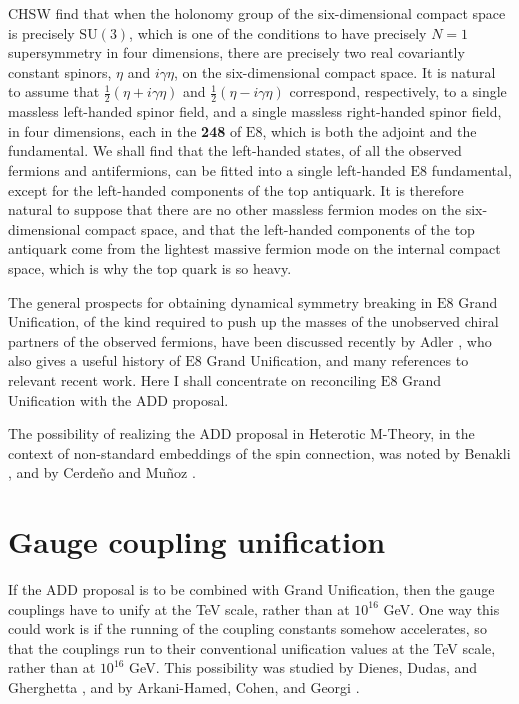 \documentclass[a4paper,12pt,oneside]{article}
\begin{document}
CHSW find that when the holonomy group of the six-dimensional 
compact space is precisely $\mathrm{SU}(3)$, which is one of the 
conditions to have precisely $N = 1$ supersymmetry in four 
dimensions, there are precisely two real covariantly constant 
spinors, $\eta$ and $i\gamma\eta$, on the six-dimensional compact 
space.  It is natural to assume that $\frac{1}{2}(\eta + 
i\gamma\eta)$ and $\frac{1}{2}(\eta - i\gamma\eta)$ correspond, 
respectively, to a single massless left-handed spinor field, and a 
single massless right-handed spinor field, in four dimensions, each 
in the \textbf{248} of $\mathrm{E}8$, which is both the adjoint and 
the fundamental.  We shall find that the left-handed states, of all 
the observed fermions and antifermions, can be fitted into a single
left-handed $\mathrm{E}8$ fundamental, except for the left-handed
components of the top antiquark.  It is therefore natural to suppose
that there are no other massless fermion modes on the 
six-dimensional compact space, and that the left-handed components 
of the top antiquark come from the lightest massive fermion mode on 
the internal compact space, which is why the top quark is so heavy.

The general prospects for obtaining dynamical symmetry breaking
in $\mathrm{E}8$ Grand Unification, of the kind required to push up
the masses of the unobserved chiral partners of the observed 
fermions, have been discussed recently by Adler \cite{Adler}, who
also gives a useful history of $\mathrm{E}8$ Grand Unification, and
many references to relevant recent work.  Here I shall concentrate
on reconciling $\mathrm{E}8$ Grand Unification with the ADD 
proposal.

The possibility of realizing the ADD proposal in Heterotic M-Theory,
in the context of non-standard embeddings of the spin connection,
was noted by Benakli \cite{Benakli}, and by Cerde\~no and Mu\~noz
\cite{CM}.

\section{Gauge coupling unification}

If the ADD proposal is to be combined with Grand Unification, then
the gauge couplings have to unify at the TeV scale, rather than at
$10^{16}$ GeV.  One way this could work is if the running of the
coupling constants somehow accelerates, so that the couplings run to
their conventional unification values at the TeV scale, rather than 
at
$10^{16}$ GeV.  This possibility was studied by Dienes, Dudas, and
Gherghetta \cite{DDG1, DDG2}, and by Arkani-Hamed, Cohen, and Georgi
\cite{ACG}.
\end{document}
